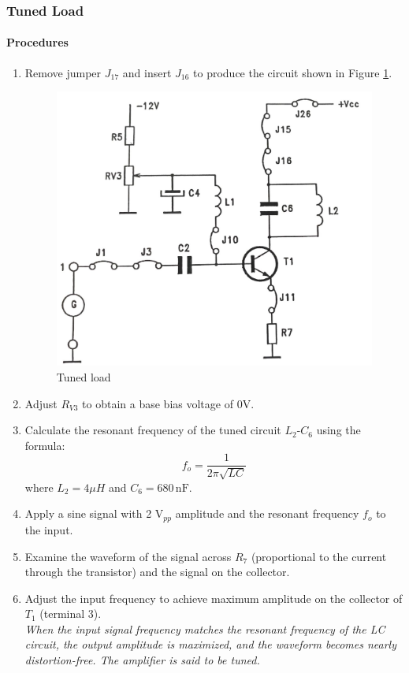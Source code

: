 \documentclass[12pt,a4paper]{article}
\begin{document}
    \subsubsection{Tuned Load}

    \paragraph{Procedures}
    \begin{enumerate}
        \item Remove jumper $J_{17}$ and insert $J_{16}$ to produce the circuit shown in Figure \ref{fig:B32.3}.
        \begin{figure}[H]
            \centering
            \includegraphics[width=0.5\linewidth]{analogue3_3.jpeg}
            \caption{Tuned load}
            \label{fig:B32.3}
        \end{figure}
        \item Adjust $R_{V3}$ to obtain a base bias voltage of 0V.
        \item Calculate the resonant frequency of the tuned circuit $L_2$-$C_6$ using the formula: \\
        \[
        f_o = \frac{1}{2\pi \sqrt{LC}}
        \]
        where \( L_2 = 4 \mu H \) and \( C_6 = 680 \, \text{nF} \).
        \item Apply a sine signal with 2 V$_{pp}$ amplitude and the resonant frequency \( f_o \) to the input.
        \item Examine the waveform of the signal across $R_7$ (proportional to the current through the transistor) and the signal on the collector.
        \item Adjust the input frequency to achieve maximum amplitude on the collector of $T_1$ (terminal 3). \\
        \textit{When the input signal frequency matches the resonant frequency of the LC circuit, the output amplitude is maximized, and the waveform becomes nearly distortion-free. The amplifier is said to be tuned.}

\end{enumerate}
\end{document}
